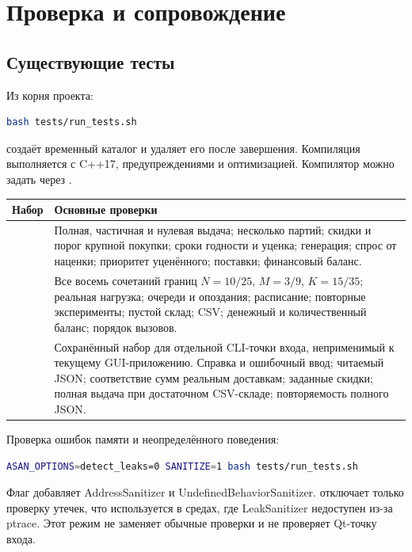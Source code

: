 \section{Проверка и сопровождение}
\label{sec:testing}

\subsection{Существующие тесты}
Из корня проекта:
\begin{lstlisting}[language=bash]
bash tests/run_tests.sh
\end{lstlisting}

 создаёт временный каталог и удаляет его после
завершения. Компиляция выполняется с C++17, предупреждениями
 и оптимизацией.
Компилятор можно задать через .

\begin{tabularx}{\textwidth}{@{}L{0.30\textwidth}Y@{}}
\toprule
Набор & Основные проверки \\
\midrule
{} & Полная, частичная и нулевая выдача; несколько
партий; скидки и порог крупной покупки; сроки годности и уценка; генерация;
спрос от наценки; приоритет уценённого; поставки; финансовый баланс. \\
 & Все восемь сочетаний границ $N=10/25$,
$M=3/9$, $K=15/35$; реальная нагрузка; очереди и опоздания; расписание;
повторные эксперименты; пустой склад; CSV; денежный и количественный баланс;
порядок вызовов. \\
 & Сохранённый набор для отдельной CLI-точки входа, неприменимый к текущему GUI-приложению. Справка и ошибочный ввод;
читаемый JSON; соответствие сумм реальным доставкам; заданные скидки;
полная выдача при достаточном CSV-складе; повторяемость полного JSON. \\
\bottomrule
\end{tabularx}

Проверка ошибок памяти и неопределённого поведения:
\begin{lstlisting}[language=bash]
ASAN_OPTIONS=detect_leaks=0 SANITIZE=1 bash tests/run_tests.sh
\end{lstlisting}
Флаг  добавляет AddressSanitizer и UndefinedBehaviorSanitizer.
 отключает только проверку утечек, что используется
в средах, где LeakSanitizer недоступен из-за ptrace. Этот режим не заменяет
обычные проверки и не проверяет Qt-точку входа.

